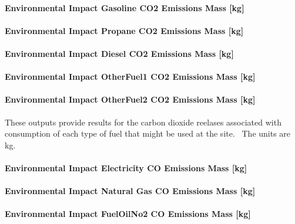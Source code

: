\paragraph{Environmental Impact Gasoline CO2 Emissions Mass {[}kg{]}}\label{environmental-impact-gasoline-co2-emissions-mass-kg}

\paragraph{Environmental Impact Propane CO2 Emissions Mass {[}kg{]}}\label{environmental-impact-propane-co2-emissions-mass-kg}

\paragraph{Environmental Impact Diesel CO2 Emissions Mass {[}kg{]}}\label{environmental-impact-diesel-co2-emissions-mass-kg}

\paragraph{Environmental Impact OtherFuel1 CO2 Emissions Mass {[}kg{]}}\label{environmental-impact-otherfuel1-co2-emissions-mass-kg}

\paragraph{Environmental Impact OtherFuel2 CO2 Emissions Mass {[}kg{]}}\label{environmental-impact-otherfuel2-co2-emissions-mass-kg}

These outputs provide results for the carbon dioxide reelases associated with consumption of each type of fuel that might be used at the site.~ The units are kg.

\paragraph{Environmental Impact Electricity CO Emissions Mass {[}kg{]}}\label{environmental-impact-electricity-co-emissions-mass-kg}

\paragraph{Environmental Impact Natural Gas CO Emissions Mass {[}kg{]}}\label{environmental-impact-natural-gas-co-emissions-mass-kg}

\paragraph{Environmental Impact FuelOilNo2 CO Emissions Mass {[}kg{]}}\label{environmental-impact-fuel-oil-2-co-emissions-mass-kg}

